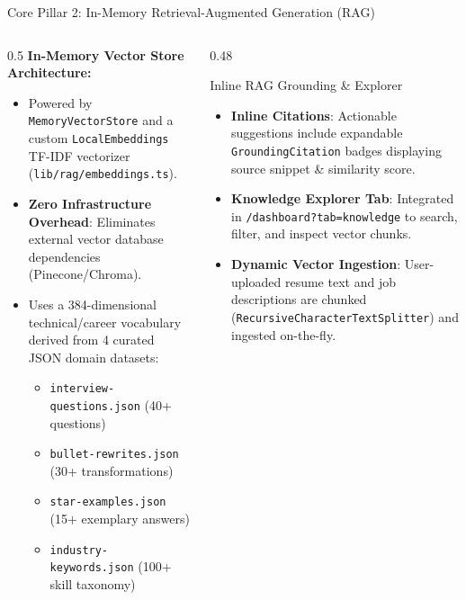 \documentclass[aspectratio=169, 10pt]{beamer}
\begin{document}
\begin{frame}{Core Pillar 2: In-Memory Retrieval-Augmented Generation (RAG)}
  \begin{columns}
    \begin{column}{0.5\textwidth}
      \textbf{In-Memory Vector Store Architecture:}
      \begin{itemize}
        \item Powered by \texttt{MemoryVectorStore} and a custom \texttt{LocalEmbeddings} TF-IDF vectorizer (\texttt{lib/rag/embeddings.ts}).
        \item \textbf{Zero Infrastructure Overhead}: Eliminates external vector database dependencies (Pinecone/Chroma).
        \item Uses a 384-dimensional technical/career vocabulary derived from 4 curated JSON domain datasets:
          \begin{itemize}
            \item \texttt{interview-questions.json} (40+ questions)
            \item \texttt{bullet-rewrites.json} (30+ transformations)
            \item \texttt{star-examples.json} (15+ exemplary answers)
            \item \texttt{industry-keywords.json} (100+ skill taxonomy)
          \end{itemize}
      \end{itemize}
    \end{column}

    \begin{column}{0.48\textwidth}
      \begin{block}{Inline RAG Grounding \& Explorer}
        \small
        \begin{itemize}
          \item \textbf{Inline Citations}: Actionable suggestions include expandable \texttt{GroundingCitation} badges displaying source snippet \& similarity score.
          \item \textbf{Knowledge Explorer Tab}: Integrated in \texttt{/dashboard?tab=knowledge} to search, filter, and inspect vector chunks.
          \item \textbf{Dynamic Vector Ingestion}: User-uploaded resume text and job descriptions are chunked (\texttt{RecursiveCharacterTextSplitter}) and ingested on-the-fly.
        \end{itemize}
      \end{block}
    \end{column}
  \end{columns}
\end{frame}
\end{document}
